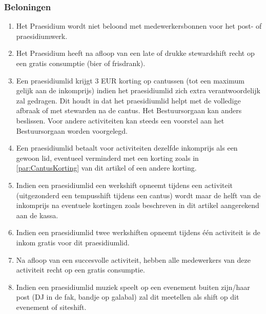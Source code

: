     \subsubsection{Beloningen}
    \begin{enumerate}
    \item Het Praesidium wordt niet beloond met medewerkersbonnen voor het post- of praesidiumwerk.
    \item Het Praesidium heeft na afloop van een late of drukke stewardshift recht op een gratis consumptie (bier of frisdrank).
    \item Een praesidiumlid krijgt 3 EUR korting op cantussen (tot een maximum gelijk aan de inkomprijs) indien het praesidiumlid zich extra verantwoordelijk zal gedragen. Dit houdt in dat het praesidiumlid helpt met de volledige afbraak of met stewarden na de cantus.
    Het Bestuursorgaan kan anders beslissen. Voor andere activiteiten kan steeds een voorstel aan het Bestuursorgaan worden voorgelegd.\label{par:CantusKorting}
    \item Een praesidiumlid betaalt voor activiteiten dezelfde inkomprijs als een gewoon lid, eventueel verminderd met een korting zoals in \ref{par:CantusKorting} van dit artikel of een andere korting.
    \item Indien een praesidiumlid een werkshift opneemt tijdens een activiteit (uitgezonderd een tempusshift tijdens een cantus) wordt maar de helft van de inkomprijs na eventuele kortingen zoals beschreven in dit artikel aangerekend aan de kassa. 
    \item Indien een praesidiumlid twee werkshiften opneemt tijdens één activiteit is de inkom gratis voor dit praesidiumlid.
    \item Na afloop van een succesvolle activiteit, hebben alle medewerkers van deze activiteit recht op een gratis consumptie.
    \item Indien een praesidiumlid muziek speelt op een evenement buiten zijn/haar post (DJ in de fak, bandje op galabal) zal dit meetellen als shift op dit evenement of siteshift.
    \end{enumerate}
    
